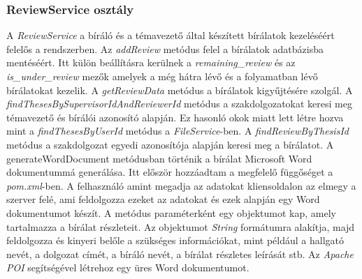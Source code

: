 \subsubsection{ReviewService osztály}

A \textit{ReviewService} a bíráló és a témavezető által készített bírálatok kezeléséért felelős a rendszerben. Az \textit{addReview} metódus felel a bírálatok adatbázisba mentéséért. Itt külön beállításra kerülnek a \textit{remaining\_review} és az \textit{is\_under\_review} mezők amelyek a még hátra lévő és a folyamatban lévő bírálatokat kezelik. A \textit{getReviewData} metódus a bírálatok kigyűjtésére szolgál. A \textit{findThesesBySupervisorIdAndReviewerId} metódus a szakdolgozatokat keresi meg témavezető és bírálói azonosító alapján. Ez hasonló okok miatt lett létre hozva mint a \textit{findThesesByUserId} metódus a \textit{FileService}-ben. A \textit{findReviewByThesisId} metódus a szakdolgozat egyedi azonosítója alapján keresi meg a bírálatot. A generateWordDocument metódusban történik a bírálat Microsoft Word dokumentummá generálása. Itt először hozzáadtam a megfelelő függőséget a \textit{pom.xml}-ben. A felhasználó amint megadja az adatokat kliensoldalon az elmegy a szerver felé, ami feldolgozza ezeket az adatokat és ezek alapján egy Word dokumentumot készít. A metódus paraméterként egy objektumot kap, amely tartalmazza a bírálat részleteit. Az objektumot \textit{String} formátumra alakítja, majd feldolgozza és kinyeri belőle a szükséges információkat, mint például a hallgató nevét, a dolgozat címét, a bíráló nevét, a bírálat részletes leírását stb. Az \textit{Apache POI} \cite{Apache POI} segítségével létrehoz egy üres Word dokumentumot.
